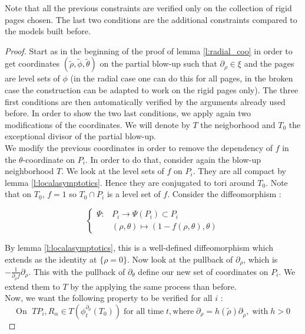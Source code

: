 \documentclass[../main.tex]{subfiles}
\begin{document}
\begin{remark}
Note that all the previous constraints are verified only on the collection of rigid pages chosen. The last two conditions are the additional constraints compared to the models built before.
\end{remark}

\begin{proof}
Start as in the beginning of the proof of lemma \ref{l:radial_coo} in order to get coordinates $(\tilde\rho,\tilde\phi,\tilde\theta)$ on the partial blow-up such that $\partial_\rho\in\xi$ and the pages are level sets of $\phi$ (in the radial case one can do this for all pages, in the broken case the construction can be adapted to work on the rigid pages only). The three first conditions are then automatically verified by the arguments already used before. In order to show the two last conditions, we apply again two modifications of the coordinates. We will denote by $T$ the neigborhood and $T_0$ the exceptional divisor of the partial blow-up.\\

We modify the previous coordinates in order to remove the dependency of $f$ in the $\theta$-coordinate on $P_i$. In order to do that, consider again the blow-up neighborhood $T$. We look at the level sets of $f$ on $P_i$. They are all compact by lemma \ref{l:localasymptotics}. Hence they are conjugated to tori around $T_0$. Note that on $T_0$, $f = 1$ so $T_0\cap P_i$ is a level set of $f$. Consider the diffeomorphism :

$$\left\{
    \begin{array}{ll}
        \Psi : &P_i \rightarrow  \Psi(P_i)\subset P_i\\
               &(\rho,\theta)\mapsto (1-f(\rho,\theta),\theta) 
    \end{array}
\right.$$

By lemma \ref{l:localasymptotics}, this is a well-defined diffeomorphism which extends as the identity at $\{\rho = 0\}$. Now look at the pullback of $\partial_\rho$, which is $-\frac{1}{\partial_\rho f}\partial_\rho$. This with the pullback of $\partial_\theta$ define our new set of coordinates on $P_i$. We extend them to $T$ by the applying the same process than before.\\

Now, we want the following property to be verified for all $i$ :
$$\text{On } \;TP_i, R_\alpha \in T(\phi_t^{\partial_\rho}(T_0))\; \text{for all time}\; t, \text{where} \;\partial_\rho = h(\tilde{\rho})\partial_{\tilde{\rho}}, \;\text{with}\; h> 0$$
    

\end{proof}
\end{document}
